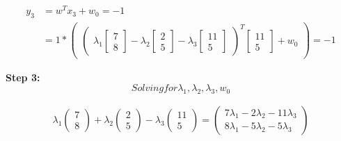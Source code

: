 \documentclass[12pt]{report}
\begin{document}
\begin{equation*}
	\begin{aligned}
		y_{3} & =  w^T x_{3} + w_{0} = -1               \\
		      & = 1 * \begin{pmatrix}
			              \begin{pmatrix}
				\lambda_{1}\begin{bmatrix}
					           7 \\
					           8
				           \end{bmatrix} -

				\lambda_{2}\begin{bmatrix}
					           2 \\
					           5
				           \end{bmatrix} -

				\lambda_{3}\begin{bmatrix}
					           11 \\
					           5
				           \end{bmatrix}
			\end{pmatrix}  ^ T
			              \begin{bmatrix}
				11 \\
				5
			\end{bmatrix} + w_{0}
		              \end{pmatrix} = -1
	\end{aligned}
\end{equation*}

\textbf{Step 3:}
\begin{equation*}
	Solving for \lambda_{1}, \lambda_{2}, \lambda_{3}, w_{0}
\end{equation*}


\begin{equation*}
	\begin{aligned}
		\lambda_{1}\begin{pmatrix}7 \\ 8\end{pmatrix}+\lambda_{2}\begin{pmatrix}2\\ 5\end{pmatrix}-\lambda_{3}\begin{pmatrix}11\\ 5\end{pmatrix}=\begin{pmatrix}7\lambda_{1}-2\lambda_{2}-11\lambda_{3}\\ 8\lambda_{1}-5\lambda_{2}-5\lambda_{3}\end{pmatrix}
	\end{aligned}
\end{equation*}
\end{document}
